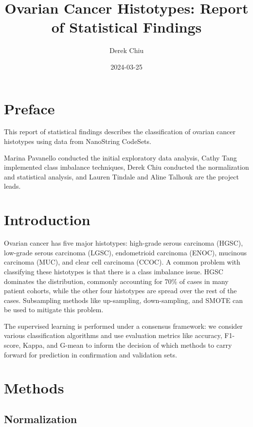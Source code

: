 \documentclass[
]{report}
\title{Ovarian Cancer Histotypes: Report of Statistical Findings}
\author{Derek Chiu}
\date{2024-03-25}
\begin{document}
\maketitle

{
\hypersetup{linkcolor=}
\setcounter{tocdepth}{1}
\tableofcontents
}
\listoffigures
\listoftables
\hypertarget{preface}{%
\chapter*{Preface}\label{preface}}

This report of statistical findings describes the classification of ovarian cancer histotypes using data from NanoString CodeSets.

Marina Pavanello conducted the initial exploratory data analysis, Cathy Tang implemented class imbalance techniques, Derek Chiu conducted the normalization and statistical analysis, and Lauren Tindale and Aline Talhouk are the project leads.

\hypertarget{introduction}{%
\chapter{Introduction}\label{introduction}}

Ovarian cancer has five major histotypes: high-grade serous carcinoma (HGSC), low-grade serous carcinoma (LGSC), endometrioid carcinoma (ENOC), mucinous carcinoma (MUC), and clear cell carcinoma (CCOC). A common problem with classifying these histotypes is that there is a class imbalance issue. HGSC dominates the distribution, commonly accounting for 70\% of cases in many patient cohorts, while the other four histotypes are spread over the rest of the cases. Subsampling methods like up-sampling, down-sampling, and SMOTE can be used to mitigate this problem.

The supervised learning is performed under a consensus framework: we consider various classification algorithms and use evaluation metrics like accuracy, F1-score, Kappa, and G-mean to inform the decision of which methods to carry forward for prediction in confirmation and validation sets.

\hypertarget{methods}{%
\chapter{Methods}\label{methods}}

\hypertarget{normalization}{%
\section{Normalization}\label{normalization}}
\end{document}
